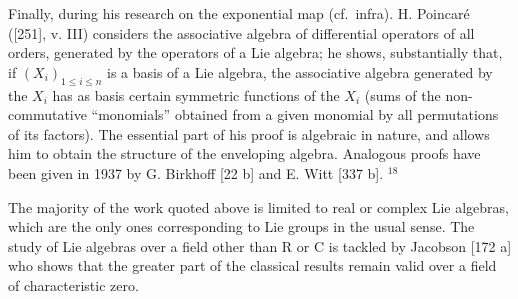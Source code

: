 Finally, during his research on the exponential map (cf.~infra). H. Poincaré ({[}251{]}, v. III) considers the associative algebra of differential operators of all orders, generated by the operators of a Lie algebra; he shows, substantially that, if \((X_{i})_{1\leq i\leq n}\) is a basis of a Lie algebra, the associative algebra generated by the \(X_{i}\) has as basis certain symmetric functions of the \(X_{i}\) (sums of the non-commutative ``monomials'' obtained from a given monomial by all permutations of its factors). The essential part of his proof is algebraic in nature, and allows him to obtain the structure of the enveloping algebra. Analogous proofs have been given in 1937 by G. Birkhoff {[}22 b{]} and E. Witt {[}337 b{]}. \(^{18}\)

The majority of the work quoted above is limited to real or complex Lie algebras, which are the only ones corresponding to Lie groups in the usual sense. The study of Lie algebras over a field other than R or C is tackled by Jacobson {[}172 a{]} who shows that the greater part of the classical results remain valid over a field of characteristic zero.

